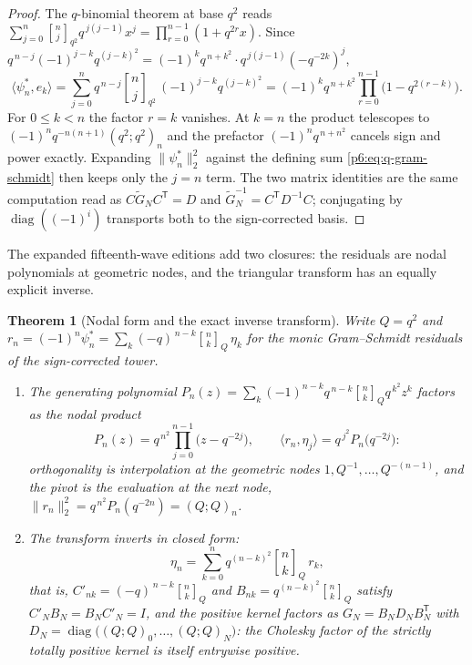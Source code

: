 \documentclass[11pt,oneside]{article}
\numberwithin{equation}{section}
\newtheorem{theorem}{Theorem}[section]
\theoremstyle{definition}
\theoremstyle{remark}
\newcommand{\qbinom}[3]{\genfrac{[}{]}{0pt}{}{#1}{#2}_{#3}}
\begin{document}
\begin{proof}
The $q$-binomial theorem at base $q^2$ reads
$\sum_{j=0}^n\qbinom{n}{j}{q^2}q^{\,j(j-1)}x^j=\prod_{r=0}^{n-1}(1+q^{2r}x)$.
Since $q^{\,n-j}(-1)^{j-k}q^{(j-k)^2}
=(-1)^kq^{\,n+k^2}\cdot q^{\,j(j-1)}(-q^{-2k})^j$,
\[
 \langle\psi_n^{\ast},e_k\rangle
 =\sum_{j=0}^{n}q^{\,n-j}\qbinom{n}{j}{q^2}\,(-1)^{j-k}q^{(j-k)^2}
 =(-1)^kq^{\,n+k^2}\prod_{r=0}^{n-1}\bigl(1-q^{2(r-k)}\bigr).
\]
For $0\le k<n$ the factor $r=k$ vanishes.  At $k=n$ the product telescopes
to $(-1)^nq^{-n(n+1)}(q^2;q^2)_n$ and the prefactor $(-1)^nq^{\,n+n^2}$
cancels sign and power exactly.  Expanding $\|\psi_n^{\ast}\|_2^2$ against
the defining sum \eqref{p6:eq:q-gram-schmidt} then keeps only the $j=n$
term.  The two matrix identities are the same computation read as
$C\widetilde G_NC^{\mathsf T}=D$ and
$\widetilde G_N^{-1}=C^{\mathsf T}D^{-1}C$; conjugating by
$\operatorname{diag}((-1)^i)$ transports both to the sign-corrected
basis.
\end{proof}

The expanded fifteenth-wave editions add two closures: the residuals are
nodal polynomials at geometric nodes, and the triangular transform has an
equally explicit inverse.

\begin{theorem}[Nodal form and the exact inverse transform]
\label{p6:thm:gs-nodal-inverse}
Write $Q=q^2$ and
$r_n=(-1)^n\psi_n^{\ast}=\sum_{k}(-q)^{\,n-k}\qbinom{n}{k}{Q}\,\eta_k$
for the monic Gram--Schmidt residuals of the sign-corrected tower.
\begin{enumerate}
\item The generating polynomial
$P_n(z)=\sum_k(-1)^{n-k}q^{\,n-k}\qbinom{n}{k}{Q}q^{\,k^2}z^k$ factors as
the nodal product
\begin{equation}\label{p6:eq:gs-nodal}
 P_n(z)=q^{\,n^2}\prod_{j=0}^{n-1}\bigl(z-q^{-2j}\bigr),
 \qquad
 \langle r_n,\eta_j\rangle=q^{\,j^2}P_n\bigl(q^{-2j}\bigr):
\end{equation}
orthogonality is interpolation at the geometric nodes
$1,Q^{-1},\ldots,Q^{-(n-1)}$, and the pivot is the evaluation at the next
node, $\|r_n\|_2^2=q^{\,n^2}P_n(q^{-2n})=(Q;Q)_n$.
\item The transform inverts in closed form:
\begin{equation}\label{p6:eq:gs-inverse}
 \boxed{\ \eta_n=\sum_{k=0}^{n}q^{(n-k)^2}\qbinom{n}{k}{Q}\,r_k,\ }
\end{equation}
that is, $C'_{nk}=(-q)^{\,n-k}\qbinom{n}{k}{Q}$ and
$B_{nk}=q^{(n-k)^2}\qbinom{n}{k}{Q}$ satisfy $C'_NB_N=B_NC'_N=I$, and the
positive kernel factors as
$G_N=B_ND_NB_N^{\mathsf T}$ with
$D_N=\operatorname{diag}\bigl((Q;Q)_0,\ldots,(Q;Q)_N\bigr)$: the Cholesky
factor of the strictly totally positive kernel is itself entrywise
positive.
\end{enumerate}
\end{theorem}
\end{document}
